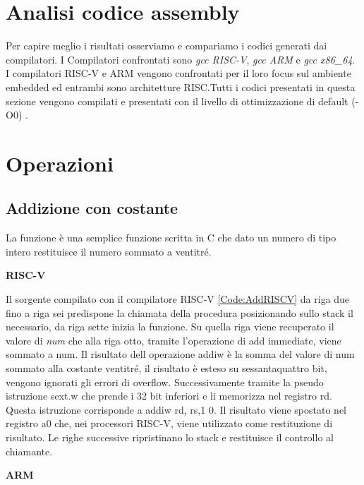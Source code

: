 \documentclass[12pt,a4paper]{report}
\begin{document}
	
\section{Analisi codice assembly}
Per capire meglio i risultati osserviamo e compariamo i codici generati dai compilatori.  I Compilatori confrontati sono \textit{gcc RISC-V},  \textit{gcc ARM} e \textit{gcc x86\_64}.  I compilatori RISC-V e ARM vengono confrontati per il loro focus sul ambiente embedded ed entrambi sono architetture RISC.Tutti i codici presentati in questa sezione vengono compilati e presentati con il livello di ottimizzazione di default (-O0) \cite{ConfrontoISABook}.


\section{Operazioni}
\subsection{Addizione con costante}



La funzione è una semplice funzione scritta in C che dato un numero di tipo intero restituisce il numero sommato a ventitré. 

\vspace{0.3 cm}
\textbf{RISC-V}

\vspace{0.3 cm}
Il sorgente compilato con il compilatore RISC-V \ref{Code:AddRISCV} da riga due fino a riga sei predispone la chiamata della procedura posizionando sullo stack il necessario, da riga sette inizia la funzione. Su quella riga viene recuperato il valore di \textit{num} che alla riga otto, tramite l'operazione di add immediate, viene sommato a num. Il risultato dell operazione addiw è la somma del valore di num sommato alla costante ventitré, il risultato è esteso su sessantaquattro bit, vengono ignorati gli errori di overflow. Successivamente tramite la pseudo istruzione sext.w che prende i 32 bit inferiori e li memorizza nel registro rd.  Questa istruzione corrisponde a addiw rd, rs,1 0. Il risultato viene spostato nel registro a0 che, nei processori RISC-V, viene utilizzato come restituzione di risultato. Le righe successive ripristinano lo stack e restituisce il controllo al chiamante.

\vspace{0.3 cm}
\textbf{ARM}
\end{document}
